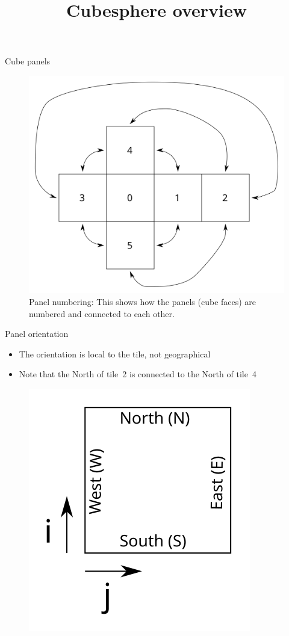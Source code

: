 \documentclass{beamer}
\title{Cubesphere overview}
\begin{document}
\begin{frame}
    \titlepage
\end{frame}

\begin{frame}{Cube panels}
\begin{figure}
    \includegraphics[scale=0.5]{img/panel_numbering}
    \caption{Panel numbering: This shows how the panels (cube faces) are numbered and connected to each other.}
\end{figure}
\end{frame}


\begin{frame}{Panel orientation}
\begin{itemize}
    \item The orientation is local to the tile, not geographical
    \item Note that the North of tile~2 is connected to the North of tile~4
\end{itemize}
\begin{figure}
    \includegraphics[scale=0.9]{img/tile_orientation}
\end{figure}
\end{frame}
\end{document}
